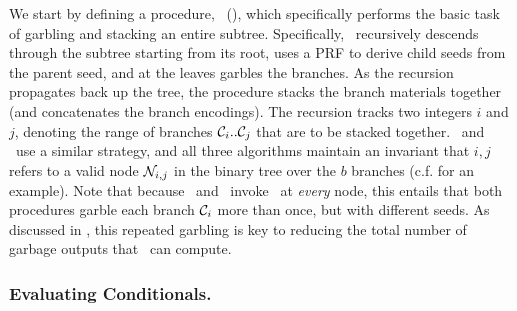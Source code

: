 We start by defining a procedure, \gbtree~(),
which specifically performs the basic task of garbling and stacking an entire
subtree.
%
Specifically, \gbtree\ recursively descends through the
subtree starting from its root, uses a PRF to derive child seeds from the parent seed, and at the
leaves garbles the branches.
As the recursion propagates back up the tree, the procedure stacks the
branch materials together (and concatenates the branch encodings).
%
The recursion tracks two integers $i$ and
$j$, denoting the range of branches $\mathcal C_i..\mathcal C_j$ that are to
be stacked together.
\evcond\ and \gbcond\ use a similar strategy, and all three algorithms
maintain an invariant that $i,j$ refers to a valid node $\mathtt{\cal N}_{i,j}$ in the binary
tree over the $b$ branches (c.f.  for an
example).
%
Note that because \evcond\ and \gbcond\ invoke \gbtree\ at
\emph{every} node, this entails that both procedures garble
each branch $\mathcal C_i$ more than once, but with different seeds.
As discussed in , this repeated garbling is key
to reducing the total number of garbage outputs that \E\
can compute.


\subsubsection{Evaluating Conditionals.}

